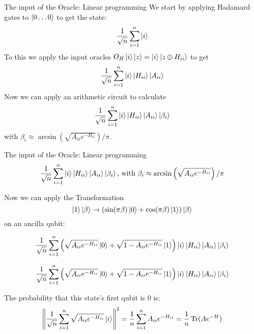 \begin{frame}{The input of the Oracle: Linear programming}
We start by applying Hadamard gates to $\ket{0\ldots 0}$ to get the state:
\begin{equation*}
\frac{1}{\sqrt{n}}\sum_{i=1}^n\ket{i}
\end{equation*}
\pause
To this we apply the input oracles $O_H\ket{i}\ket{z}=\ket{i}\ket{z\oplus H_{ii}}$ to get
\begin{equation*}
\frac{1}{\sqrt{n}}\sum_{i=1}^n\ket{i}\ket{H_{ii}}\ket{A_{ii}}
\end{equation*}
\pause
Now we can apply an arithmetic circuit to calculate
\begin{equation*}
\frac{1}{\sqrt{n}}\sum_{i=1}^n\ket{i}\ket{H_{ii}}\ket{A_{ii}}\ket{\beta_i}
\end{equation*}
with $\beta_i\approx\arcsin\left(\sqrt{A_{ii}e^{-H_{ii}}}\right)/\pi$.

\end{frame}

\begin{frame}{The input of the Oracle: Linear programming}
\begin{equation*}
\frac{1}{\sqrt{n}}\sum_{i=1}^n\ket{i}\ket{H_{ii}}\ket{A_{ii}}\ket{\beta_i} \text{, with } \beta_i\approx\arcsin\left(\sqrt{A_{ii}e^{-H_{ii}}}\right)/\pi
\end{equation*}

\vspace{1cm}

Now we can apply the Transformation 
\begin{equation*}
\ket{1}\ket{\beta}\to (\sin(\pi\beta)\ket{0}+\cos(\pi\beta)\ket{1})\ket{\beta}
\end{equation*}
on an ancilla qubit:

\begin{equation*}
\frac{1}{\sqrt{n}}\sum_{i=1}^n\left(\sqrt{A_{ii}e^{-H_{ii}}}\ket{0}+\sqrt{1-A_{ii}e^{-H_{ii}}}\ket{1}\right)\ket{i}\ket{H_{ii}}\ket{A_{ii}}\ket{\beta_i}
\end{equation*}
\end{frame}

\begin{frame}
\begin{equation*}
\frac{1}{\sqrt{n}}\sum_{i=1}^n\left(\sqrt{A_{ii}e^{-H_{ii}}}\ket{0}+\sqrt{1-A_{ii}e^{-H_{ii}}}\ket{1}\right)\ket{i}\ket{H_{ii}}\ket{A_{ii}}\ket{\beta_i}
\end{equation*}

The probability that this state's first qubit is 0 is:
\begin{equation*}
\left\|\frac{1}{\sqrt{n}}\sum_{i=1}^n\sqrt{A_{ii}e^{-H_{ii}}}\ket{i}\right\|^2=\frac{1}{n}\sum_{i=1}^n A_{ii}e^{-H_{ii}}=\frac{1}{n}\operatorname{Tr}(Ae^{-H})
\end{equation*}
\end{frame}

